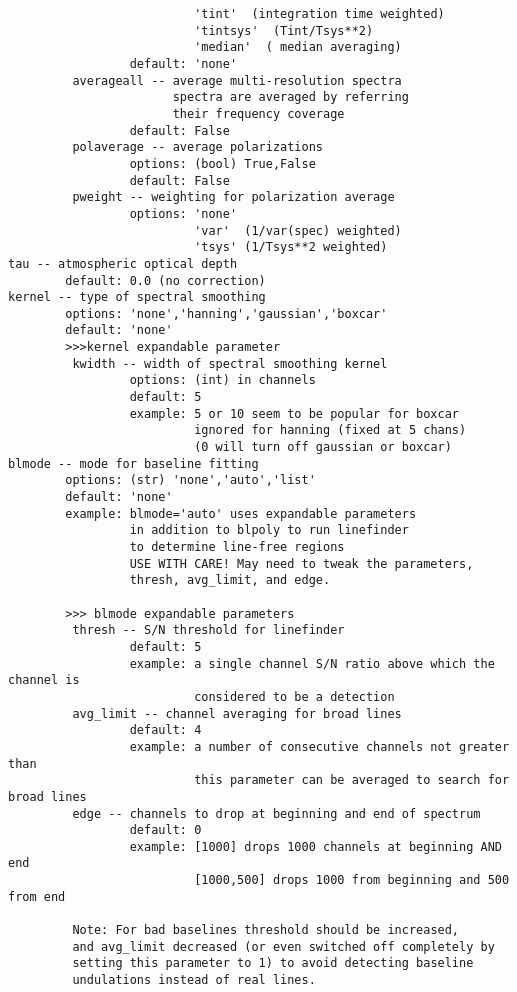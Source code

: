 \begin{verbatim}
                          'tint'  (integration time weighted)
                          'tintsys'  (Tint/Tsys**2)
                          'median'  ( median averaging)
                 default: 'none'
         averageall -- average multi-resolution spectra
                       spectra are averaged by referring
                       their frequency coverage
                 default: False
         polaverage -- average polarizations
                 options: (bool) True,False
                 default: False
         pweight -- weighting for polarization average
                 options: 'none'
                          'var'  (1/var(spec) weighted)
                          'tsys' (1/Tsys**2 weighted)
tau -- atmospheric optical depth
        default: 0.0 (no correction)
kernel -- type of spectral smoothing
        options: 'none','hanning','gaussian','boxcar'
        default: 'none'
        >>>kernel expandable parameter
         kwidth -- width of spectral smoothing kernel
                 options: (int) in channels
                 default: 5
                 example: 5 or 10 seem to be popular for boxcar
                          ignored for hanning (fixed at 5 chans)
                          (0 will turn off gaussian or boxcar)
blmode -- mode for baseline fitting
        options: (str) 'none','auto','list'
        default: 'none'
        example: blmode='auto' uses expandable parameters
                 in addition to blpoly to run linefinder
                 to determine line-free regions
                 USE WITH CARE! May need to tweak the parameters,
                 thresh, avg_limit, and edge.

        >>> blmode expandable parameters
         thresh -- S/N threshold for linefinder
                 default: 5
                 example: a single channel S/N ratio above which the channel is
                          considered to be a detection
         avg_limit -- channel averaging for broad lines
                 default: 4
                 example: a number of consecutive channels not greater than
                          this parameter can be averaged to search for broad lines
         edge -- channels to drop at beginning and end of spectrum
                 default: 0
                 example: [1000] drops 1000 channels at beginning AND end
                          [1000,500] drops 1000 from beginning and 500 from end

         Note: For bad baselines threshold should be increased,
         and avg_limit decreased (or even switched off completely by
         setting this parameter to 1) to avoid detecting baseline
         undulations instead of real lines.


\end{verbatim}
